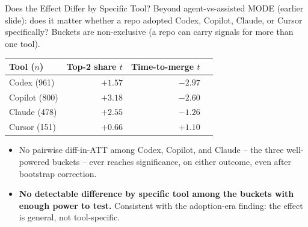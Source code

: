 \begin{frame}{Does the Effect Differ by Specific Tool?}
Beyond agent-vs-assisted MODE (earlier slide): does it matter whether a
repo adopted Codex, Copilot, Claude, or Cursor specifically? Buckets are
non-exclusive (a repo can carry signals for more than one tool).
\begin{table}
\centering
\small
\begin{tabular}{lrrr}
\toprule
Tool ($n$) & Top-2 share $t$ & Time-to-merge $t$ \\
\midrule
Codex (961)    & $+1.57$ & $-2.97$ \\
Copilot (800)  & $+3.18$ & $-2.60$ \\
Claude (478)   & $+2.55$ & $-1.26$ \\
Cursor (151)   & $+0.66$ & $+1.10$ \\
\bottomrule
\end{tabular}
\end{table}
\begin{itemize}
  \item No pairwise diff-in-ATT among Codex, Copilot, and Claude --
        the three well-powered buckets -- ever reaches significance,
        on either outcome, even after bootstrap correction.
  \item \textbf{No detectable difference by specific tool among the
        buckets with enough power to test.} Consistent with the
        adoption-era finding: the effect is general, not tool-specific.
\end{itemize}
\end{frame}

